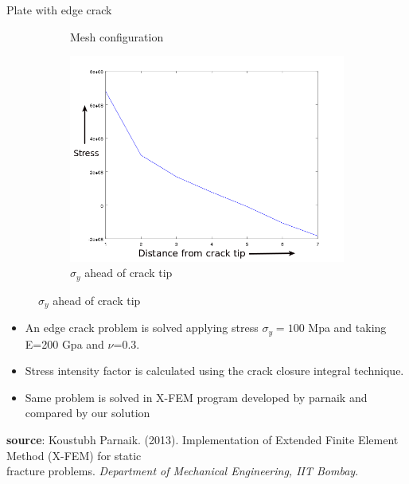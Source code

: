 \documentclass{beamer}
\begin{document}
\begin{frame}[t,fragile]{Plate with edge crack}
\begin{figure}
\begin{subfigure}{.2\textwidth}
            \caption{\scriptsize Mesh configuration}
    \end{subfigure}
    \hspace{1pt}
    \begin{subfigure}{.5\textwidth}
        \includegraphics[scale=.25]{onlystress}
        \vspace{-5pt}
         \caption{\scriptsize $\sigma_y$ ahead of crack tip}
    \end{subfigure}
\end{figure}
    \vspace{-10pt}
\begin{itemize}
        \scriptsize
    \item An edge crack problem is solved applying stress $\sigma_y=100$ Mpa and taking E=200 Gpa and $\nu$=0.3.
    \item Stress intensity factor is calculated using the crack closure integral technique. 
    \item Same problem is solved in X-FEM program developed by parnaik and compared by our solution 
\end{itemize}
\tiny
   \hspace{15pt}
   \textbf{source}:  Koustubh Parnaik. (2013). Implementation of Extended Finite Element Method (X-FEM) for static\\
   \hspace{15pt}fracture problems.
\emph{Department of Mechanical Engineering, IIT Bombay}.

\end{frame}
\end{document}
